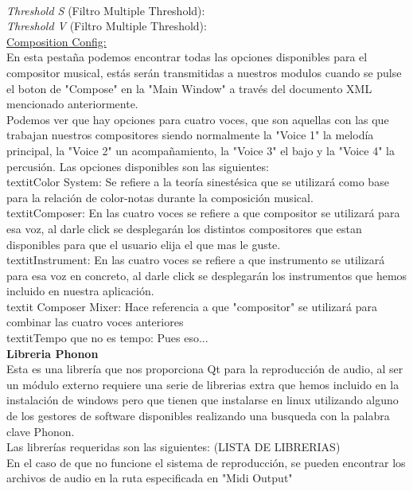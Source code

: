 \\\textit{Threshold S} (Filtro Multiple Threshold):
\\\textit{Threshold V} (Filtro Multiple Threshold):
\newline
\\\underline{Composition Config:}
\\En esta pestaña podemos encontrar todas las opciones disponibles para el compositor musical, estás serán transmitidas a nuestros modulos cuando se pulse el boton de "Compose" en la "Main Window" a través del documento XML mencionado anteriormente.
\\Podemos ver que hay opciones para cuatro voces, que son aquellas con las que trabajan nuestros compositores siendo normalmente la "Voice 1" la melodía principal, la "Voice 2" un acompañamiento, la "Voice 3" el bajo y la "Voice 4" la percusión. Las opciones disponibles son las siguientes:
\newline
\\textit{Color System:} Se refiere a la teoría sinestésica que se utilizará como base para la relación de color-notas durante la composición musical.
\\textit{Composer:} En las cuatro voces se refiere a que compositor se utilizará para esa voz, al darle click se desplegarán los distintos compositores que estan disponibles para que el usuario elija el que mas le guste.
\\textit{Instrument:} En las cuatro voces se refiere a que instrumento se utilizará para esa voz en concreto, al darle click se desplegarán los instrumentos que hemos incluido en nuestra aplicación.
\\textit {Composer Mixer:} Hace referencia a que "compositor" se utilizará para combinar las cuatro voces anteriores
\\textit{Tempo que no es tempo:} Pues eso...
\newline
\\{\bf Libreria Phonon}
\\Esta es una librería que nos proporciona Qt para la reproducción de audio, al ser un módulo externo requiere una serie de librerias extra que hemos incluido en la instalación de windows pero que tienen que instalarse en linux utilizando alguno de los gestores de software disponibles realizando una busqueda con la palabra clave Phonon.
\\Las librerías requeridas son las siguientes: (LISTA DE LIBRERIAS)
\\En el caso de que no funcione el sistema de reproducción, se pueden encontrar los archivos de audio en la ruta especificada en "Midi Output"
